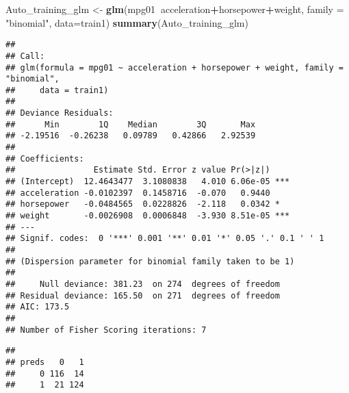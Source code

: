 \documentclass[]{article}
\newenvironment{Shaded}{\begin{snugshade}}{\end{snugshade}}
\newcommand{\KeywordTok}[1]{\textcolor[rgb]{0.13,0.29,0.53}{\textbf{#1}}}
\newcommand{\DataTypeTok}[1]{\textcolor[rgb]{0.13,0.29,0.53}{#1}}
\newcommand{\DecValTok}[1]{\textcolor[rgb]{0.00,0.00,0.81}{#1}}
\newcommand{\FloatTok}[1]{\textcolor[rgb]{0.00,0.00,0.81}{#1}}
\newcommand{\StringTok}[1]{\textcolor[rgb]{0.31,0.60,0.02}{#1}}
\newcommand{\CommentTok}[1]{\textcolor[rgb]{0.56,0.35,0.01}{\textit{#1}}}
\newcommand{\OperatorTok}[1]{\textcolor[rgb]{0.81,0.36,0.00}{\textbf{#1}}}
\newcommand{\NormalTok}[1]{#1}
\begin{document}
\begin{Shaded}
\begin{Highlighting}[]
\NormalTok{Auto_training_glm <-}\StringTok{ }\KeywordTok{glm}\NormalTok{(mpg01}\OperatorTok{~}\NormalTok{acceleration}\OperatorTok{+}\NormalTok{horsepower}\OperatorTok{+}\NormalTok{weight, }\DataTypeTok{family =} \StringTok{"binomial"}\NormalTok{, }\DataTypeTok{data=}\NormalTok{train1)}
\KeywordTok{summary}\NormalTok{(Auto_training_glm)}
\end{Highlighting}
\end{Shaded}

\begin{verbatim}
## 
## Call:
## glm(formula = mpg01 ~ acceleration + horsepower + weight, family = "binomial", 
##     data = train1)
## 
## Deviance Residuals: 
##      Min        1Q    Median        3Q       Max  
## -2.19516  -0.26238   0.09789   0.42866   2.92539  
## 
## Coefficients:
##                Estimate Std. Error z value Pr(>|z|)    
## (Intercept)  12.4643477  3.1080838   4.010 6.06e-05 ***
## acceleration -0.0102397  0.1458716  -0.070   0.9440    
## horsepower   -0.0484565  0.0228826  -2.118   0.0342 *  
## weight       -0.0026908  0.0006848  -3.930 8.51e-05 ***
## ---
## Signif. codes:  0 '***' 0.001 '**' 0.01 '*' 0.05 '.' 0.1 ' ' 1
## 
## (Dispersion parameter for binomial family taken to be 1)
## 
##     Null deviance: 381.23  on 274  degrees of freedom
## Residual deviance: 165.50  on 271  degrees of freedom
## AIC: 173.5
## 
## Number of Fisher Scoring iterations: 7
\end{verbatim}

\begin{Shaded}
\end{Shaded}

\begin{verbatim}
##      
## preds   0   1
##     0 116  14
##     1  21 124
\end{verbatim}
\end{document}
